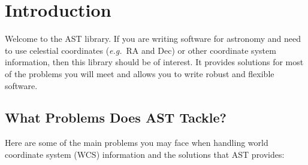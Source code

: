 \documentclass[twoside,11pt]{article}
\newcommand{\htmlref}[2]{#1}
\begin{document}
\vspace{7mm}

\section{Introduction}

Welcome to the AST library. If you are writing software for astronomy
and need to use celestial coordinates ({\em{e.g.}}\ RA and Dec) or
other coordinate system information, then this library should be of
interest. It provides solutions for most of the problems you will meet
and allows you to write robust and flexible software.


\subsection{What Problems Does AST Tackle?}

Here are some of the main problems you may face when handling world
coordinate system (WCS) information and the solutions that AST
provides:
\end{document}
